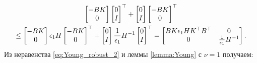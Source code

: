 \begin{multline}
	\label{eq:thm1_term_1}
	\begin{bmatrix}
		-{BK} \\ 0
	\end{bmatrix}\begin{bmatrix}
		0 \\ {I}
	\end{bmatrix}^\top
	+\begin{bmatrix}
		0 \\ {I} 
	\end{bmatrix}\begin{bmatrix}
		-{BK} \\0
	\end{bmatrix}^\top 
	\\ 
	\leq
	\begin{bmatrix}
		-{BK} \\ 0
	\end{bmatrix} \epsilon_1 {H} \begin{bmatrix}
		-{BK} \\ 0
	\end{bmatrix}^\top +\begin{bmatrix}
		0 \\ {I}
	\end{bmatrix}\frac{1}{\epsilon_1}{H}^{-1}\begin{bmatrix}
		0 \\ {I}
	\end{bmatrix}^\top =
	\begin{bmatrix}
		{BK}\epsilon_1{H}{K}^\top{B}^\top & 0 \\
		0 & \frac{1}{\epsilon_1}{H}^{-1}
	\end{bmatrix}.
\end{multline}
%
Из неравенства \eqref{eq:Young_robust_2} и леммы \ref{lemma:Young} с $\nu=1$ получаем:
%
